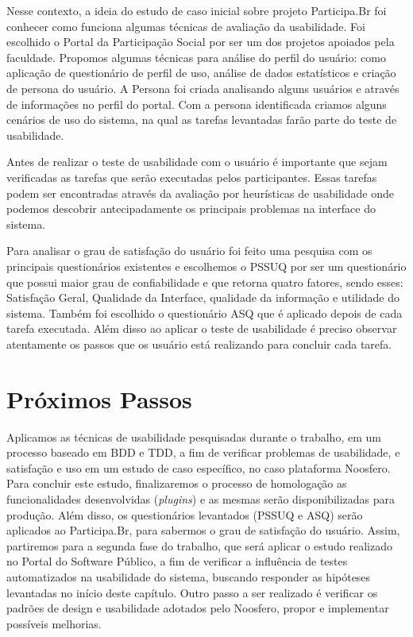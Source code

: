 
Nesse contexto, a ideia do estudo de caso inicial sobre projeto Participa.Br foi conhecer como funciona algumas técnicas de avaliação da usabilidade. Foi escolhido o Portal da Participação Social por ser um dos projetos apoiados pela faculdade.
%
Propomos algumas técnicas para análise do perfil do usuário: como aplicação de questionário de perfil de uso, análise de dados estatísticos e criação de persona do usuário.
%
A Persona foi criada analisando alguns usuários e através de informações no perfil do portal.
%
Com a persona identificada criamos alguns cenários de uso do sistema, na qual as tarefas levantadas farão parte do teste de usabilidade.

Antes de realizar o teste de usabilidade com o usuário é importante que sejam verificadas as tarefas que serão executadas pelos participantes. Essas tarefas podem ser encontradas através da avaliação por heurísticas de usabilidade onde podemos descobrir antecipadamente os principais problemas na interface do sistema.

Para analisar o grau de satisfação do usuário foi feito uma pesquisa com os principais questionários existentes e escolhemos o PSSUQ por ser um questionário que possui maior grau de confiabilidade e que retorna quatro fatores, sendo esses: Satisfação Geral, Qualidade da Interface, qualidade da informação e utilidade do sistema.
%
Também foi escolhido o questionário ASQ que é aplicado depois de cada tarefa executada. Além disso ao aplicar o teste de usabilidade é preciso observar atentamente os passos que os usuário está realizando para concluir cada tarefa.


\section{Próximos Passos}

Aplicamos as técnicas de usabilidade pesquisadas durante o trabalho, em um processo baseado em BDD e TDD, a fim de verificar problemas de usabilidade, e satisfação e uso em um estudo de caso específico, no caso plataforma Noosfero. 
%
Para concluir este estudo, finalizaremos o processo de  homologação as funcionalidades desenvolvidas (\textit{plugins}) e as mesmas serão disponibilizadas para produção.
%
Além disso, os questionários levantados (PSSUQ e ASQ) serão aplicados ao Participa.Br, para sabermos o grau de satisfação do usuário. 
%
Assim, partiremos para a segunda fase do trabalho, que será aplicar o estudo realizado  no Portal do Software Público, a fim de verificar a influência de testes automatizados na usabilidade do sistema, buscando responder as hipóteses levantadas no início deste capítulo. Outro passo a ser realizado é verificar os padrões de design e usabilidade adotados pelo Noosfero, propor e implementar possíveis melhorias.

